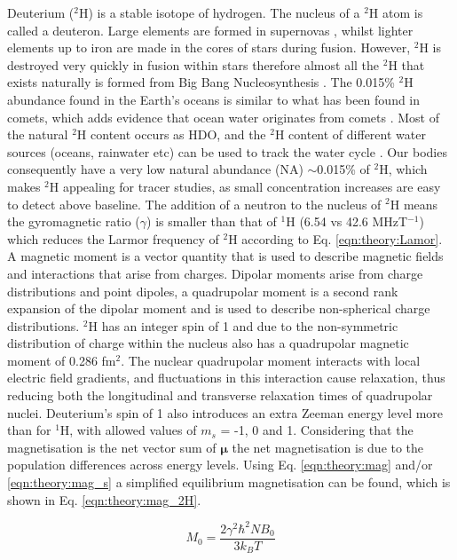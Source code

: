 Deuterium ($^2$H) is a stable isotope of hydrogen. The nucleus of a $^2$H atom is called a deuteron. Large elements are formed in supernovas \cite{Watson2019IdentificationStars}, whilst lighter elements up to iron are made in the cores of stars during fusion. However, $^2$H is destroyed very quickly in fusion within stars \cite{Patrignani2016ReviewPhysics} therefore almost all the $^2$H that exists naturally is formed from Big Bang Nucleosynthesis \cite{Joseph2023GeologicalEarth}. The 0.015\% $^2$H abundance found in the Earth's oceans is similar to what has been found in comets, which adds evidence that ocean water originates from comets \cite{Hersant2001APlanets}. Most of the natural $^2$H content occurs as \ac{HDO}, and the $^2$H content of different water sources (oceans, rainwater etc) can be used to track the water cycle \cite{Bowen2019IsotopesApplications}. Our bodies consequently have a very low natural abundance (NA) $\sim$0.015\% of $^2$H, which makes $^2$H appealing for tracer studies, as small concentration increases are easy to detect above baseline. The addition of a neutron to the nucleus of $^2$H means the gyromagnetic ratio ($\gamma$) is smaller than that of $^1$H (6.54 vs 42.6 MHzT$^{-1}$) which reduces the Larmor frequency of $^2$H according to Eq. \ref{eqn:theory:Lamor}. A magnetic moment is a vector quantity that is used to describe magnetic fields and interactions that arise from charges. Dipolar moments arise from charge distributions and point dipoles, a quadrupolar moment is a second rank expansion of the dipolar moment and is used to describe non-spherical charge distributions. $^2$H has an integer spin of 1 and due to the non-symmetric distribution of charge within the nucleus also has a quadrupolar magnetic moment of 0.286 fm$^2$. The nuclear quadrupolar moment interacts with local electric field gradients, and fluctuations in this interaction cause relaxation, thus reducing both the longitudinal and transverse relaxation times of quadrupolar nuclei. Deuterium's spin of 1 also introduces an extra Zeeman energy level more than for $^1$H, with allowed values of $m_s$ = -1, 0 and 1. Considering that the magnetisation is the net vector sum of $\mathbf{\mu}$ the net magnetisation is due to the population differences 
across energy levels. Using Eq. \ref{eqn:theory:mag} and/or \ref{eqn:theory:mag_s} a simplified equilibrium magnetisation can be found, which is shown in Eq. \ref{eqn:theory:mag_2H}.

\begin{equation}
    M_0 = \frac{2\gamma^2 \hbar^2 N B_0}{3k_BT}
    \label{eqn:theory:mag_2H}
\end{equation}

